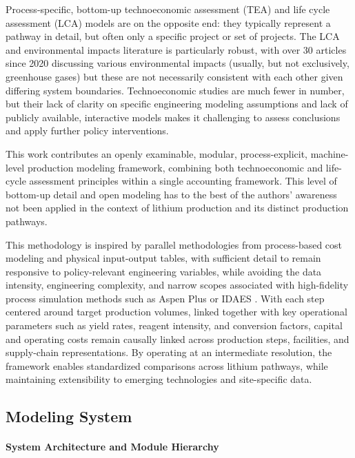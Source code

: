 Process-specific, bottom-up technoeconomic assessment (TEA) and life cycle assessment (LCA) models are on the opposite end: they typically represent a pathway in detail, but often only a specific project or set of projects. The LCA and environmental impacts literature is particularly robust, with over 30 articles since 2020 discussing various environmental impacts (usually, but not exclusively, greenhouse gases) but these are not necessarily consistent with each other given differing system boundaries. Technoeconomic studies are much fewer in number, but their lack of clarity on specific engineering modeling assumptions and lack of publicly available, interactive models makes it challenging to assess conclusions and apply further policy interventions.

This work contributes an openly examinable, modular, process-explicit, machine-level production modeling framework, combining both technoeconomic and life-cycle assessment principles within a single accounting framework. This level of bottom-up detail and open modeling has to the best of the authors' awareness not been applied in the context of lithium production and its distinct production pathways.

This methodology is inspired by parallel methodologies from process-based cost modeling and physical input-output tables, with sufficient detail to remain responsive to policy-relevant engineering variables, while avoiding the data intensity, engineering complexity, and narrow scopes associated with high-fidelity process simulation methods such as Aspen Plus or IDAES \cite{leeIDAESProcessModeling2021}. With each step centered around target production volumes, linked together with key operational parameters such as yield rates, reagent intensity, and conversion factors, capital and operating costs remain causally linked across production steps, facilities, and supply-chain representations. By operating at an intermediate resolution, the framework enables standardized comparisons across lithium pathways, while maintaining extensibility to emerging technologies and site-specific data.

\clearpage
\subsection{Modeling System}\label{app:04-methods-system}

\paragraph{System Architecture and Module Hierarchy}\label{app:04-methods-system-hierarchy}

